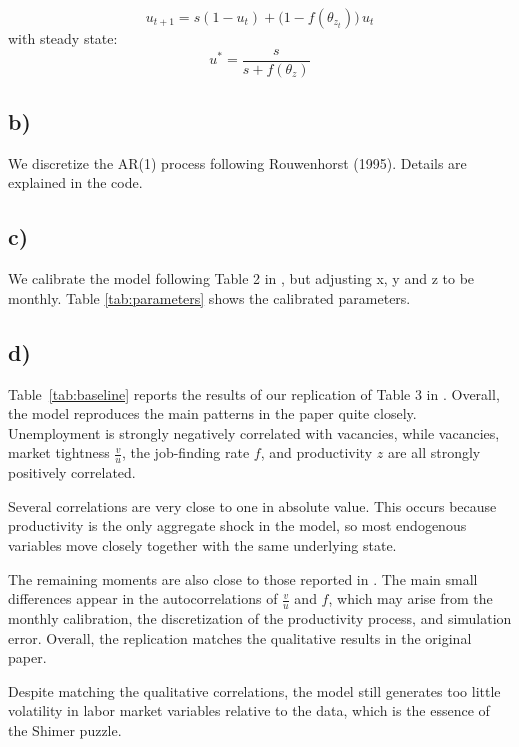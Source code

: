 \documentclass[12pt]{article}
\begin{document}
\begin{equation}
    u_{t+1} = s(1 - u_t) + \bigl(1 - f(\theta_{z_t})\bigr)\,u_t
\end{equation}
with steady state:
\begin{equation}
    u^* = \frac{s}{s + f(\theta_z)}
\end{equation}




\subsection*{b)}

We discretize the AR(1) process following Rouwenhorst (1995). Details are explained in the code. \\

\subsection*{c)}
We calibrate the model following Table 2 in \citet{shimer2005} , but adjusting
x, y and z to be monthly. 
Table \ref{tab:parameters} shows the calibrated parameters. \\

\subsection*{d)}

Table~\ref{tab:baseline} reports the results of our replication of Table 3 in \citet{shimer2005}. Overall, the model reproduces the main patterns in the paper quite closely. Unemployment is strongly negatively correlated with vacancies, while vacancies, market tightness $\frac{v}{u}$, the job-finding rate $f$, and productivity $z$ are all strongly positively correlated.

Several correlations are very close to one in absolute value. This occurs because productivity is the only aggregate shock in the model, so most endogenous variables move closely together with the same underlying state.

The remaining moments are also close to those reported in \citet{shimer2005}. The main small differences appear in the autocorrelations of $\frac{v}{u}$ and $f$, which may arise from the monthly calibration, the discretization of the productivity process, and simulation error. Overall, the replication matches the qualitative results in the original paper.

Despite matching the qualitative correlations, the model still generates too little volatility in labor market variables relative to the data, which is the essence of the Shimer puzzle.
\end{document}
